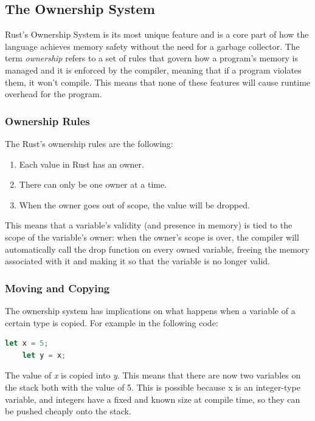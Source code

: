 \subsection{The Ownership System}
Rust's Ownership System is its most unique feature and is a core part of how the language achieves memory safety without the need for a garbage collector.
The term \textit{ownership} refers to a set of rules that govern how a program's memory is managed and it is enforced by the compiler, meaning that if
a program violates them, it won't compile. This means that none of these features will cause runtime overhead for the program.

\subsubsection{Ownership Rules}
The Rust's ownership rules are the following:

\begin{enumerate}
    \item Each value in Rust has an owner.
    \item There can only be one owner at a time.
    \item When the owner goes out of scope, the value will be dropped.
\end{enumerate}

This means that a variable's validity (and presence in memory) is tied to the scope of the variable's owner: when the owner's scope is over, the compiler will automatically
call the drop function on every owned variable, freeing the memory associated with it and making it so that the variable is no longer valid.

\subsubsection{Moving and Copying}
The ownership system has implications on what happens when a variable of a certain type is copied. For example in the following code:

\begin{lstlisting}[language=Rust]
    let x = 5;
    let y = x;
\end{lstlisting}

The value of \textit{x} is copied into \textit{y}. This means that there are now two variables on the stack both with the value of 5. This is possible because x is an integer-type variable,
and integers have a fixed and known size at compile time, so they can be pushed cheaply onto the stack.

